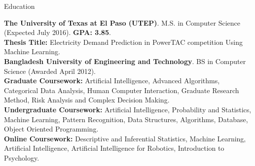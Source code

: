 \documentclass[]{mcdowellcv}
\begin{document}
	\makeheader
	
	
	\begin{cvsection}{Education}
		\begin{cvsubsection}{}{}{}
				\textbf{The University of Texas at El Paso (UTEP)}. M.S. in Computer Science (Expected July 2016). \textbf{GPA: 3.85}. \\
				\textbf{Thesis Title:} Electricity Demand Prediction in PowerTAC competition Using Machine Learning. \\
				\textbf{Bangladesh University of Engineering and Technology}. BS in Computer Science (Awarded April 2012).  \\
				\textbf{Graduate Coursework:} Artificial Intelligence, Advanced Algorithms, Categorical Data Analysis, Human Computer Interaction, Graduate Research Method, Risk Analysis and Complex Decision Making. \\
				\textbf{Undergraduate Coursework:} Artificial Intelligence, Probability and Statistics, Machine Learning, Pattern Recognition, Data Structures, Algorithms, Database, Object Oriented Programming. \\
				\textbf{Online Coursework:} Descriptive and Inferential Statistics, Machine Learning, Artificial Intelligence, Artificial Intelligence for Robotics, Introduction to Psychology.
		\end{cvsubsection}
	\end{cvsection}
\end{document}
